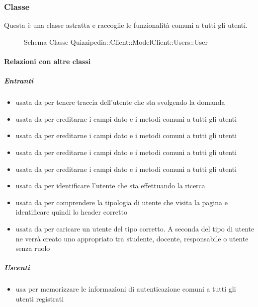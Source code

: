\subsubsection{Classe }
Questa è una classe astratta e raccoglie le funzionalità comuni a tutti gli utenti.
\begin{figure}[H]
\centering
\noindent{}
\caption[Schema Classe User]{Schema Classe Quizzipedia::Client::ModelClient::Users::User}
\end{figure}
\paragraph{Relazioni con altre classi}
\subparagraph{Entranti}
\begin{itemize}
\item usata da  per tenere traccia dell'utente che sta svolgendo la domanda
\item usata da  per ereditarne i campi dato e i metodi comuni a tutti gli utenti
\item usata da  per ereditarne i campi dato e i metodi comuni a tutti gli utenti
\item usata da  per ereditarne i campi dato e i metodi comuni a tutti gli utenti
\item usata da  per ereditarne i campi dato e i metodi comuni a tutti gli utenti
\item usata da  per identificare l'utente che sta effettuando la ricerca
\item usata da  per comprendere la tipologia di utente che visita la pagina e identificare quindi lo header corretto
\item usata da  per caricare un utente del tipo corretto. A seconda del tipo di utente ne verrà creato uno appropriato tra studente, docente, responsabile o utente senza ruolo
\end{itemize}
\subparagraph{Uscenti}
\begin{itemize}
\item usa  per memorizzare le informazioni di autenticazione comuni a tutti gli utenti registrati
\end{itemize}
